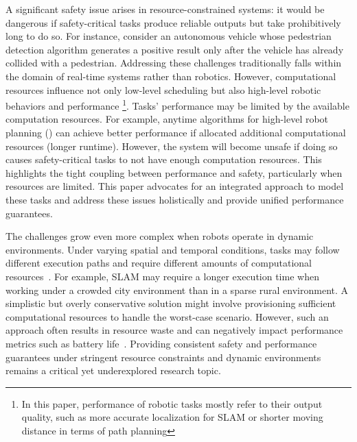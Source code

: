     A significant safety issue arises in resource-constrained systems: it would be dangerous if 
	safety-critical tasks
    produce reliable outputs but take prohibitively long to do so. 
	For instance, consider an autonomous vehicle whose
    pedestrian detection algorithm generates a positive result only after the vehicle has already
    collided with a pedestrian. Addressing these challenges traditionally falls within the domain of
    real-time systems rather than robotics. However, computational resources influence not only
    low-level scheduling but also high-level robotic behaviors and performance
    \footnote{In this paper, performance of robotic tasks mostly refer to their output quality, such as more
    accurate localization for SLAM or shorter moving distance in terms of path planning}.
    Tasks' performance may be limited by the available computation resources.
    For example, anytime algorithms for high-level robot planning (\eg \cite{Huang23ICRA_TSP}) can
    achieve better performance if allocated additional computational resources (\ie longer runtime).
    However, the system will become unsafe if doing so causes safety-critical tasks to not have
    enough computation resources. This highlights the tight coupling between performance and safety,
    particularly when resources are limited. This paper advocates for an integrated approach to
    model these tasks and address these issues holistically and provide unified performance guarantees.


    The challenges grow even more complex when robots operate in dynamic
    environments. Under varying spatial and temporal conditions, tasks may follow different execution
    paths and require different amounts of computational
    resources~\cite{Ash23RAL, Sifat2021TowardsCA}.
    For example, SLAM may require a longer execution time when working under a crowded city
    environment than in a sparse rural environment.
    A simplistic but overly conservative solution might involve provisioning sufficient computational
    resources to handle the worst-case scenario. However, such an approach often results in resource
    waste and can negatively impact performance metrics such as battery
    life~\cite{Maxim2022ProbabilisticA}. Providing consistent safety and performance guarantees
    under stringent resource constraints and dynamic environments remains a critical yet
    underexplored research topic.

